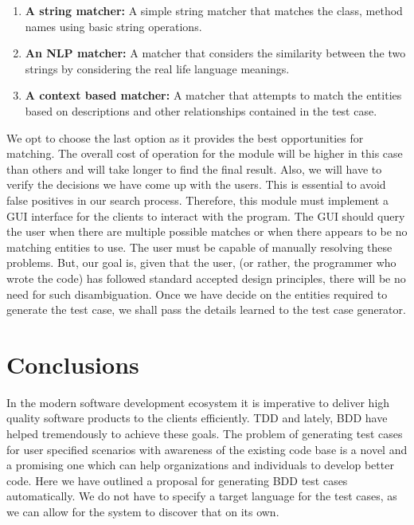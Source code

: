 \documentclass[conference]{IEEEtran}
\begin{document}
\begin{enumerate}
	\item \textbf{A string matcher:} A simple string matcher that matches the class, method names using basic string operations.
	\item \textbf{An NLP matcher:} A matcher that considers the similarity between the two strings by considering the real life language meanings.
	\item \textbf{A context based matcher:} A matcher that attempts to match the entities based on descriptions and other relationships contained in the test case.
\end{enumerate}
 We opt to choose the last option as it provides the best opportunities for matching. The overall cost of operation for the module will be higher in this case than others and will take longer to find the final result.\newline
 Also, we will have to verify the decisions we have come up with the users. This is essential to avoid false positives in our search process. Therefore, this module must implement a GUI interface for the clients to interact with the program. The GUI should query the user when there are multiple possible matches or when there appears to be no matching entities to use. The user must be capable of manually resolving these problems. But, our goal is, given that the user, (or rather, the programmer who wrote the code) has followed standard accepted design principles, there will be no need for such disambiguation.\newline
 Once we have decide on the entities required to generate the test case, we shall pass the details learned to the test case generator.
 

\section{Conclusions}
In the modern software development ecosystem it is imperative to deliver high quality software products to the clients efficiently. TDD and lately, BDD have helped tremendously to achieve these goals. The problem of generating test cases for user specified scenarios with awareness of the existing code base is a novel and a promising one which can help organizations and individuals to develop better code. Here we have outlined a proposal for generating BDD test cases automatically. We do not have to specify a target language for the test cases, as we can allow for the system to discover that on its own.
\end{document}
